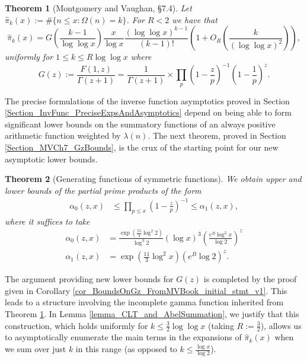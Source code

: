 \documentclass[11pt,reqno,a4letter]{article}
\numberwithin{figure}{section}
\numberwithin{table}{section}
\theoremstyle{plain}
\newtheorem{theorem}{Theorem}
\numberwithin{theorem}{section}
\theoremstyle{definition}
\begin{document}
\begin{theorem}[Montgomery and Vaughan, \S 7.4]
\label{theorem_HatPi_ExtInTermsOfGz} 
Let $\widehat{\pi}_k(x) := \#\{n \leq x: \Omega(n)=k\}$. For $R < 2$ we have that 
\[
\widehat{\pi}_k(x) = G\left(\frac{k-1}{\log\log x}\right) \frac{x}{\log x} 
     \frac{(\log\log x)^{k-1}}{(k-1)!} \left(1 + O_R\left(\frac{k}{(\log\log x)^2}\right)\right),  
\]
uniformly for $1 \leq k \leq R \log\log x$ where 
\[
G(z) := \frac{F(1, z)}{\Gamma(z+1)} = \frac{1}{\Gamma(z+1)} \times 
     \prod_p \left(1-\frac{z}{p}\right)^{-1} \left(1-\frac{1}{p}\right)^z. 
\]
\end{theorem} 

The precise formulations of the inverse function asymptotics 
proved in Section \ref{Section_InvFunc_PreciseExpsAndAsymptotics} depend on being able to form 
significant lower bounds on the summatory functions of an always positive arithmetic function 
weighted by $\lambda(n)$. 
The next theorem, proved in Section \ref{Section_MVCh7_GzBounds}, 
is the crux of the starting point for our new asymptotic lower bounds. 

\begin{theorem}[Generating functions of symmetric functions] 
\label{theorem_GFs_SymmFuncs_SumsOfRecipOfPowsOfPrimes} 
We obtain upper and lower bounds of the partial prime products of the form
\begin{align*} 
\alpha_0(z, x) & \leq \prod_{p \leq x} \left(1-\frac{z}{p}\right)^{-1} \leq \alpha_1(z, x), 
\end{align*} 
where it suffices to take 
\begin{align*}
\alpha_0(z, x) & = \frac{\exp\left(\frac{55}{4} \log^2 2\right)}{\log^3 2} (\log x)^3 
     \left(\frac{e^{B} \log^2 x}{\log 2}\right)^{z} \\ 
\alpha_1(z, x) & = \exp\left(\frac{11}{3} \log^2 x\right) \left(e^{B} \log 2\right)^{z}. 
\end{align*}  
\end{theorem} 

The argument providing new lower bounds for $G(z)$ is completed by the 
proof given in Corollary \ref{cor_BoundsOnGz_FromMVBook_initial_stmt_v1}. 
This leads to a structure involving the 
incomplete gamma function inherited from Theorem \ref{theorem_HatPi_ExtInTermsOfGz}. 
In Lemma \ref{lemma_CLT_and_AbelSummation}, we justify that this construction, 
which holds uniformly for $k \leq \frac{3}{2} \log\log x$ (taking $R := \frac{3}{2}$), 
allows us to asymptotically enumerate the main terms 
in the expansions of $\widehat{\pi}_k(x)$ when we sum over just $k$ in this range 
(as opposed to $k \leq \frac{\log x}{\log 2}$). 
\end{document}
